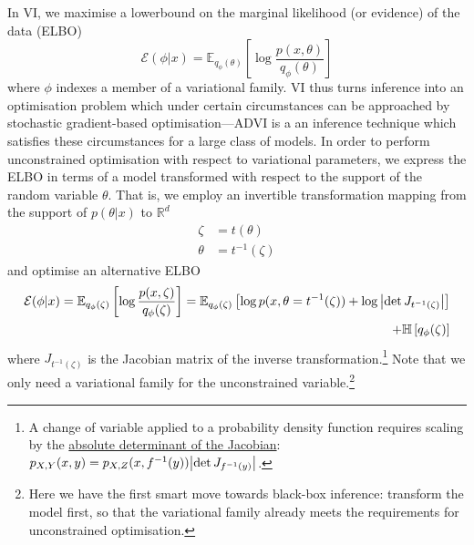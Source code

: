 \documentclass[11pt]{article}
\begin{document}
In VI, we maximise a lowerbound on the marginal likelihood (or evidence) of the data (ELBO)
\begin{equation}
	\mathcal E(\phi|x) = \mathbb E_{q_\phi(\theta)}\left[ \log \frac{p(x, \theta)}{q_\phi(\theta)} \right]
\end{equation}
where $\phi$ indexes a member of a variational family.
VI thus turns inference into an optimisation problem which under certain circumstances can be approached by stochastic gradient-based optimisation---ADVI is a an inference technique which satisfies these circumstances for a large class of models.
In order to perform unconstrained optimisation with respect to variational parameters, we express the ELBO in terms of a model transformed with respect to the support of the random variable $\theta$. That is, we employ an invertible transformation mapping from the support of $p(\theta|x)$ to $\mathbb R^d$
\begin{subequations}
\begin{align}
\zeta &= t(\theta) \\
\theta &= t^{-1}(\zeta)
\end{align}
\end{subequations}
 and optimise an alternative ELBO
\begin{equation}\label{eq:elbo}
\begin{aligned}
	\mathcal E(\phi|x) = \mathbb E_{q_\phi(\zeta)}\left[ \log \frac{p(x, \zeta)}{q_\phi(\zeta)} \right] = \mathbb E_{q_\phi(\zeta)}\left[ \log p(x, \theta=t^{-1}(\zeta)) +\log \abs{\det J_{t^{-1}(\zeta)}} \right] \\
	+ \mathbb H\left[ q_\phi(\zeta) \right]
\end{aligned}
\end{equation}
where $J_{t^{-1}(\zeta)}$ is the Jacobian matrix of the inverse transformation.\footnote{A change of variable applied to a probability density function requires scaling by the \href{https://en.wikipedia.org/wiki/Jacobian_matrix_and_determinant\#Jacobian_determinant}{absolute determinant of the Jacobian}: $p_{X,Y}(x, y) = p_{X,Z}(x, f^{-1}(y))\abs{\det J_{f^{-1}(y)}}$.}
Note that we only need a variational family for the unconstrained variable.\footnote{Here we have the first smart move towards black-box inference: transform the model first, so that the variational family already meets the requirements for unconstrained optimisation.}
\end{document}
